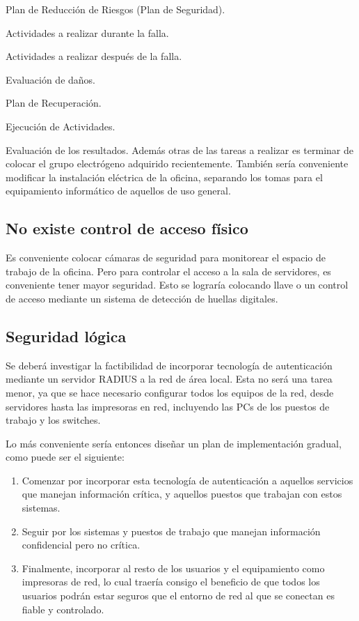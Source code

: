 \documentclass[a4paper,11pt,oneside]{article}
\begin{document}
\begin{description}
\item Plan de Reducción de Riesgos (Plan de Seguridad).
\item Actividades a realizar durante la falla.
\item Actividades a realizar después de la falla.
\item Evaluación de daños.
\item Plan de Recuperación.
\item Ejecución de Actividades.
\item Evaluación de los resultados.
Además otras de las tareas a realizar es terminar de colocar el grupo electrógeno adquirido recientemente.  También sería conveniente modificar la instalación eléctrica de la oficina, separando los tomas para el equipamiento informático de aquellos de uso general.
%
\newpage
\subsection*{No existe control de acceso físico}
Es conveniente colocar cámaras de seguridad para monitorear el espacio
de trabajo de la oficina. Pero para controlar el acceso a la sala de
servidores, es conveniente tener mayor seguridad. Esto se lograría
colocando llave o un control de acceso mediante un sistema de
detección de huellas digitales.
%
\subsection*{Seguridad lógica}
Se deberá investigar la factibilidad de incorporar tecnología de
autenticación mediante un servidor RADIUS a la red de área local.
Esta no será una tarea menor, ya que se hace necesario configurar todos
los equipos de la red, desde servidores hasta las impresoras en red, incluyendo
las PCs de los puestos de trabajo y los switches.

Lo más conveniente sería entonces diseñar un plan de implementación
gradual, como puede ser el siguiente:
\begin{enumerate}
\item Comenzar por incorporar esta tecnología de autenticación a
  aquellos servicios que manejan información crítica, y aquellos
  puestos que trabajan con estos sistemas.
\item Seguir por los sistemas y puestos de trabajo que manejan
  información confidencial pero no crítica.
\item Finalmente, incorporar al resto de los usuarios y el
  equipamiento como impresoras de red, lo cual traería consigo el
  beneficio de que todos los usuarios podrán estar seguros que el
  entorno de red al que se conectan es fiable y controlado.
\end{enumerate}


\end{description}
\end{document}
